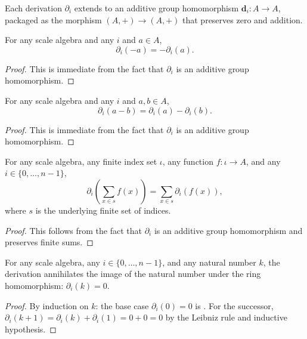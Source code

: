 \begin{definition}
Each derivation $\partial_i$ extends to an additive group homomorphism $\mathbf{d}_i : A \to A$, packaged as the morphism $(A, +) \to (A, +)$ that preserves zero and addition.
\end{definition}

\begin{theorem}
For any scale algebra and any $i$ and $a \in A$,
$$\partial_i(-a) = -\partial_i(a).$$
\end{theorem}
\begin{proof}
This is immediate from the fact that $\partial_i$ is an additive group homomorphism.
\end{proof}

\begin{theorem}
For any scale algebra and any $i$ and $a, b \in A$,
$$\partial_i(a - b) = \partial_i(a) - \partial_i(b).$$
\end{theorem}
\begin{proof}
This is immediate from the fact that $\partial_i$ is an additive group homomorphism.
\end{proof}

\begin{theorem}
For any scale algebra, any finite index set $\iota$, any function $f : \iota \to A$, and any $i \in \{0,\ldots,n-1\}$,
$$\partial_i\left(\sum_{x \in s} f(x)\right) = \sum_{x \in s} \partial_i(f(x)),$$
where $s$ is the underlying finite set of indices.
\end{theorem}
\begin{proof}
This follows from the fact that $\partial_i$ is an additive group homomorphism and preserves finite sums.
\end{proof}

\begin{theorem}
For any scale algebra, any $i \in \{0,\ldots,n-1\}$, and any natural number $k$, the derivation annihilates the image of the natural number under the ring homomorphism: $\partial_i(k) = 0$.
\end{theorem}
\begin{proof}
By induction on $k$: the base case $\partial_i(0) = 0$ is . For the successor, $\partial_i(k+1) = \partial_i(k) + \partial_i(1) = 0 + 0 = 0$ by the Leibniz rule and inductive hypothesis.
\end{proof}

